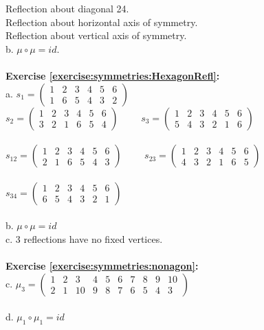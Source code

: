 Reflection about diagonal 24.\\
Reflection about horizontal axis of symmetry.\\
Reflection about vertical axis of symmetry.\\
b. $\mu\circ \mu = id$.\\
\\
\textbf{Exercise \ref{exercise:symmetries:HexagonRefl}:}\\
a. $s_1=\begin{pmatrix}
1 & 2 & 3 & 4 & 5 & 6\\
1 & 6 & 5 & 4 & 3 & 2
\end{pmatrix}$
\\
$s_2=\begin{pmatrix}
1 & 2 & 3 & 4 & 5 & 6\\
3 & 2 & 1 & 6 & 5 & 4
\end{pmatrix}$
$\qquad s_3=\begin{pmatrix}
1 & 2 & 3 & 4 & 5 & 6\\
5 & 4 & 3 & 2 & 1 & 6
\end{pmatrix}$\\
\\
$s_{12}=\begin{pmatrix}
1 & 2 & 3 & 4 & 5 & 6\\
2 & 1 & 6 & 5 & 4 & 3
\end{pmatrix}$
$\qquad s_{23}=\begin{pmatrix}
1 & 2 & 3 & 4 & 5 & 6\\
4 & 3 & 2 & 1 & 6 & 5
\end{pmatrix}$\\
\\
$s_{34}=\begin{pmatrix}
1 & 2 & 3 & 4 & 5 & 6\\
6 & 5 & 4 & 3 & 2 & 1
\end{pmatrix}$\\
\\
b. $\mu\circ\mu=id$\\
c. 3 reflections have no fixed vertices.\\
\\
\textbf{Exercise \ref{exercise:symmetries:nonagon}:}\\
c. $\mu_3=\begin{pmatrix}
1 & 2 & 3 & 4 & 5 & 6 & 7 & 8 & 9 & 10\\
2 & 1 & 10 & 9 & 8 & 7 & 6 & 5 & 4 & 3
\end{pmatrix}$\\
\\
d. $\mu_1\circ\mu_1=id$\\
